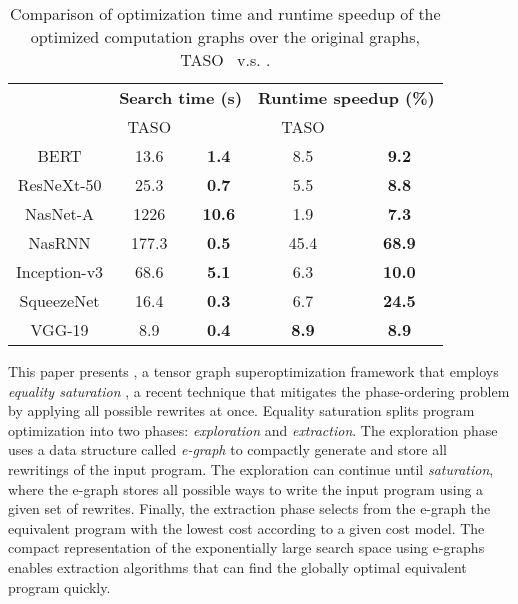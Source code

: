 \begin{table}[]
    \centering
    \footnotesize
    \begin{tabular}{ccc|cc}
    \hline
    & \multicolumn{2}{c|}{\bf Search time (s)} & \multicolumn{2}{c}{\bf Runtime speedup (\%)} \\
    & TASO & \ourname{} & TASO & \ourname{} \\
    \hline
    BERT & 13.6 & \textbf{1.4} & 8.5 & \textbf{9.2} \\
    ResNeXt-50 & 25.3 & \textbf{0.7} & 5.5 & \textbf{8.8} \\
    NasNet-A & 1226 & \textbf{10.6} & 1.9 & \textbf{7.3} \\
    NasRNN & 177.3 & \textbf{0.5} & 45.4 & \textbf{68.9} \\
    Inception-v3 & 68.6 & \textbf{5.1} & 6.3 & \textbf{10.0} \\
    SqueezeNet & 16.4 & \textbf{0.3} & 6.7 & \textbf{24.5} \\
    VGG-19 & 8.9 & \textbf{0.4} & \textbf{8.9} & \textbf{8.9} \\
    \hline
    \end{tabular}
    \caption{Comparison of optimization time and runtime speedup of the optimized computation graphs over the original graphs, TASO~\cite{taso} v.s. \ourname{}.}
    \label{table:ngraph}
\end{table}


This paper presents \ourname{}, a tensor graph superoptimization framework that employs \emph{equality saturation} \cite{eqsat, eqsat-llvm, egg},
a recent technique that mitigates the phase-ordering problem by
applying all possible rewrites at once.  %
Equality saturation splits program optimization into two phases: {\em exploration} and {\em extraction}.
The exploration phase uses a data structure called \emph{e-graph} to compactly generate and store all rewritings of the input program.
The exploration can continue until \emph{saturation},
where the e-graph stores all possible ways to write the input program using a given set of rewrites.
Finally, the extraction phase selects from the e-graph the equivalent program with the lowest cost according to a given cost model. The compact representation of the exponentially large search space using e-graphs enables extraction algorithms that can find the globally optimal equivalent program quickly.

